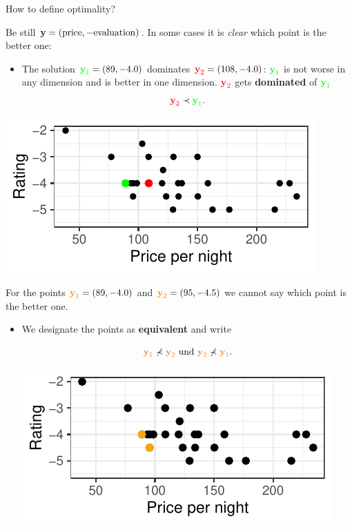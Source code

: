 \begin{frame}[allowframebreaks]{How to define optimality?}

Be still $\mathbf{y} = (\text{price}, - \text{evaluation})$. In some cases it is \textit{clear} which point is the better one:

\begin{itemize}
\item The solution $\textcolor{green}{\textbf{y}_1} = \left(89, - 4.0\right)$ dominates $\textcolor{red}{\textbf{y}_2} = \left(108, - 4.0\right)$: $\textcolor{green}{\textbf{y}_1}$ is not worse in any dimension and is better in one dimension. $\textcolor{red}{\textbf{y}_2}$ gets \textbf{dominated} of $\textcolor{green}{\textbf{y}_1}$
$$
\textcolor{red}{\textbf{y}_2} \prec \textcolor{green}{\textbf{y}_1}.
$$
\end{itemize}

\centering \includegraphics[width=\maxwidth]{images/expedia-3-1}

\framebreak

For the points $\textcolor{orange}{\textbf{y}_1} = \left(89, - 4.0\right)$ and $\textcolor{orange}{\textbf{y}_2} = \left(95, - 4.5\right)$ we cannot say which point is the better one.

\begin{itemize}
\item We designate the points as \textbf{equivalent} and write

$$
\textcolor{orange}{\textbf{y}_1} \not\prec \textcolor{orange}{\textbf{y}_2} \text{ und } \textcolor{orange}{\textbf{y}_2} \not\prec \textcolor{orange}{\textbf{y}_1}.
$$

\centering \includegraphics[width=\maxwidth]{images/expedia-4-1}



\end{itemize}
\end{frame}
